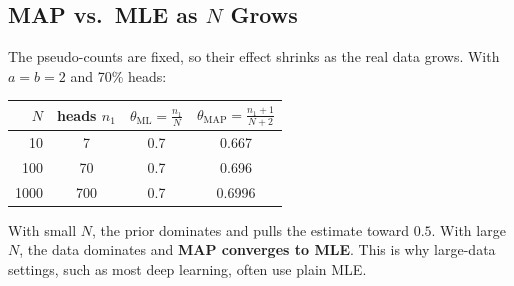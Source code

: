 \subsection*{MAP vs.\ MLE as $N$ Grows}
\begin{keeptogether}
The pseudo-counts are fixed, so their effect shrinks as the real data grows. With $a = b = 2$ and 70\% heads:

\begin{center}
\begin{tabular}{rccc}
\toprule
$N$ & heads $n_1$ & $\theta_{\text{ML}} = \tfrac{n_1}{N}$ & $\theta_{\text{MAP}} = \tfrac{n_1 + 1}{N + 2}$ \\
\midrule
10 & 7 & 0.7 & 0.667 \\
100 & 70 & 0.7 & 0.696 \\
1000 & 700 & 0.7 & 0.6996 \\
\bottomrule
\end{tabular}
\end{center}

With small $N$, the prior dominates and pulls the estimate toward $0.5$. With large $N$, the data dominates and \textbf{MAP converges to MLE}. This is why large-data settings, such as most deep learning, often use plain MLE.
\end{keeptogether}

